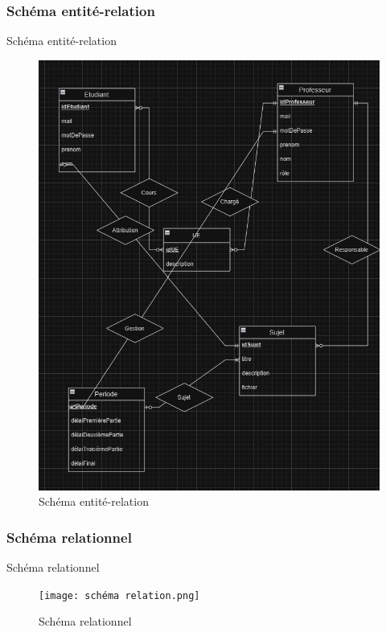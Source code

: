 \documentclass[numbering=fraction]{beamer}
\begin{document}
\subsubsection{Schéma entité-relation}
\begin{frame}{Schéma entité-relation}
    \begin{figure}[!ht]
        \centering
        \includegraphics[scale=0.5]{entiteRelation.png}
        \caption{Schéma entité-relation}
    \end{figure}
    
\end{frame}
\subsubsection{Schéma relationnel}
\begin{frame}{Schéma relationnel}
    \begin{figure}[!ht]
        \centering
        \texttt{[image: schéma relation.png]}
        \caption{Schéma relationnel}
    \end{figure}
\end{frame}
    
\end{document}
